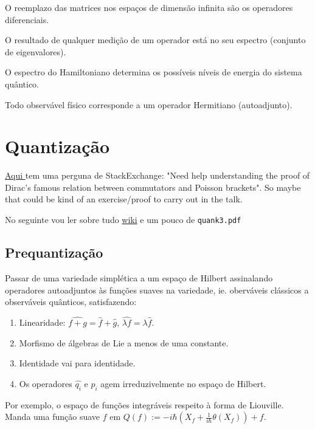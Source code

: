 \begin{remark}
	O reemplazo das matrices nos espaços de dimens\~ao infinita s\~ao os operadores diferenciais.
\end{remark}

\begin{remark}
	O resultado de qualquer medi\c c\~ao de um operador est\'a no seu espectro (conjunto de eigenvalores).
\end{remark}

O espectro do Hamiltoniano determina os poss\'iveis n\'iveis de energia do sistema qu\^antico.

Todo observ\'avel f\'isico corresponde a um operador Hermitiano (autoadjunto).


\section{Quantização}

\href{https://math.stackexchange.com/questions/4540394/need-help-understanding-the-proof-of-diracs-famous-relation-between-commutators}{Aqui } tem uma perguna de StackExchange: "Need help understanding the proof of Dirac's famous relation between commutators and Poisson brackets". So maybe that could be kind of an exercise/proof to carry out in the talk.

No seguinte vou ler sobre tudo \href{https://en.wikipedia.org/wiki/Geometric_quantization}{wiki} e um pouco de  \texttt{quank3.pdf}

\subsection{Prequantização}

Passar de uma variedade simplética a um espaço de Hilbert assinalando operadores autoadjuntos às funções suaves na variedade, ie. oberváveis clássicos a observáveis quânticos, satisfazendo:
\begin{enumerate}
	\item Linearidade: $\widehat{f+g}=\hat{f}+\hat{g}$, $\widehat{\lambda f}=\lambda\hat{f}$.
	\item Morfismo de álgebras de Lie a menos de uma constante.
	\item Identidade vai para identidade.
	\item Os operadores $\hat{q_i}$ e $\hat{p_i}$ agem irreduzivelmente no espaço de Hilbert.
\end{enumerate}


Por exemplo, o espaço de funções integráveis respeito à forma de Liouville. Manda uma função suave $f$ em $Q(f):=-i\hbar \left( X_f+\frac{1}{i\hbar}\theta(X_f) \right) +f$.

